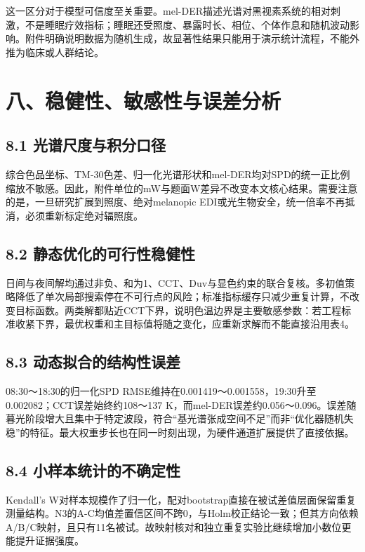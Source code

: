 \documentclass[UTF8,a4paper,12pt]{ctexart}
\begin{document}
这一区分对于模型可信度至关重要。mel-DER描述光谱对黑视素系统的相对刺激，不是睡眠疗效指标；睡眠还受照度、暴露时长、相位、个体作息和随机波动影响。附件明确说明数据为随机生成，故显著性结果只能用于演示统计流程，不能外推为临床或人群结论。

\section{八、稳健性、敏感性与误差分析}

\subsection{8.1 光谱尺度与积分口径}

综合色品坐标、TM-30色差、归一化光谱形状和mel-DER均对SPD的统一正比例缩放不敏感。因此，附件单位的mW与题面W差异不改变本文核心结果。需要注意的是，一旦研究扩展到照度、绝对melanopic EDI或光生物安全，统一倍率不再抵消，必须重新标定绝对辐照度。

\subsection{8.2 静态优化的可行性稳健性}

日间与夜间解均通过非负、和为1、CCT、Duv与显色约束的联合复核。多初值策略降低了单次局部搜索停在不可行点的风险；标准指标缓存只减少重复计算，不改变目标函数。两类解都贴近CCT下界，说明色温边界是主要敏感参数：若工程标准收紧下界，最优权重和主目标值将随之变化，应重新求解而不能直接沿用表4。

\subsection{8.3 动态拟合的结构性误差}

08:30～18:30的归一化SPD RMSE维持在0.001419～0.001558，19:30升至0.002082；CCT误差始终约108～137 K，而mel-DER误差约0.056～0.096。误差随暮光阶段增大且集中于特定波段，符合“基光谱张成空间不足”而非“优化器随机失稳”的特征。最大权重步长也在同一时刻出现，为硬件通道扩展提供了直接依据。

\subsection{8.4 小样本统计的不确定性}

Kendall's W对样本规模作了归一化，配对bootstrap直接在被试差值层面保留重复测量结构。N3的A-C均值差置信区间不跨0，与Holm校正结论一致；但其方向依赖A/B/C映射，且只有11名被试。故映射核对和独立重复实验比继续增加小数位更能提升证据强度。
\end{document}
